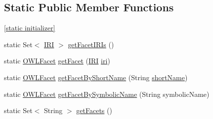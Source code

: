 \subsection*{Static Public Member Functions}
\begin{DoxyCompactItemize}
\item 
\hyperlink{enumorg_1_1semanticweb_1_1owlapi_1_1vocab_1_1_o_w_l_facet_ad0c0a1c512ed69d63290283dfee0eb99}{\mbox{[}static initializer\mbox{]}}
\item 
static Set$<$ \hyperlink{classorg_1_1semanticweb_1_1owlapi_1_1model_1_1_i_r_i}{I\-R\-I} $>$ \hyperlink{enumorg_1_1semanticweb_1_1owlapi_1_1vocab_1_1_o_w_l_facet_a108e824a623d49d8232583eac8266a2a}{get\-Facet\-I\-R\-Is} ()
\item 
static \hyperlink{enumorg_1_1semanticweb_1_1owlapi_1_1vocab_1_1_o_w_l_facet}{O\-W\-L\-Facet} \hyperlink{enumorg_1_1semanticweb_1_1owlapi_1_1vocab_1_1_o_w_l_facet_a2d1702b2de783eb415e0e7d9ca838f59}{get\-Facet} (\hyperlink{classorg_1_1semanticweb_1_1owlapi_1_1model_1_1_i_r_i}{I\-R\-I} \hyperlink{enumorg_1_1semanticweb_1_1owlapi_1_1vocab_1_1_o_w_l_facet_a13149924b7bc8978492c7c4e83aeff86}{iri})
\item 
static \hyperlink{enumorg_1_1semanticweb_1_1owlapi_1_1vocab_1_1_o_w_l_facet}{O\-W\-L\-Facet} \hyperlink{enumorg_1_1semanticweb_1_1owlapi_1_1vocab_1_1_o_w_l_facet_a4ed7de085893bc8e290ea9382d5cc850}{get\-Facet\-By\-Short\-Name} (String \hyperlink{enumorg_1_1semanticweb_1_1owlapi_1_1vocab_1_1_o_w_l_facet_a11866bbbe812f44e207fabbf8caa75b8}{short\-Name})
\item 
static \hyperlink{enumorg_1_1semanticweb_1_1owlapi_1_1vocab_1_1_o_w_l_facet}{O\-W\-L\-Facet} \hyperlink{enumorg_1_1semanticweb_1_1owlapi_1_1vocab_1_1_o_w_l_facet_a01846ff142f198407d10fbc8cb8a3303}{get\-Facet\-By\-Symbolic\-Name} (String symbolic\-Name)
\item 
static Set$<$ String $>$ \hyperlink{enumorg_1_1semanticweb_1_1owlapi_1_1vocab_1_1_o_w_l_facet_ae9b082d6efcbc480e8e15de86fc34ed7}{get\-Facets} ()
\end{DoxyCompactItemize}
